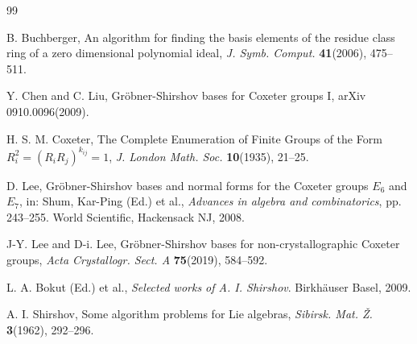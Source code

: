 \documentclass[UTF8]{amsart}
\theoremstyle{definition}
\theoremstyle{remark}
\numberwithin{equation}{section}
\begin{document}
\begin{thebibliography}{99}

B. Buchberger, An algorithm for finding the basis elements of the residue
class ring of a zero dimensional polynomial ideal, {\it J. Symb. Comput.} {\bf 41}(2006), 475--511.

Y. Chen and C. Liu, Gr\"{o}bner-Shirshov bases for {C}oxeter groups {I}, ar{X}iv 0910.0096(2009).

H. S. M. Coxeter, The Complete Enumeration of Finite Groups of the Form $R_i^2=(R_iR_j)^{k_{ij}}=1$, {\it J. London Math. Soc.} {\bf 10}(1935), 21--25.

D. Lee, Gr\"{o}bner-{S}hirshov bases and normal forms for the {C}oxeter groups $E_6$ and $E_7$, in: Shum, Kar-Ping (Ed.) et al., \emph{Advances in algebra and combinatorics}, pp. 243--255. World Scientific, Hackensack NJ, 2008.

J-Y. Lee and D-i. Lee, Gr\"{o}bner-{S}hirshov bases for non-crystallographic {C}oxeter groups, {\it Acta Crystallogr. Sect. A} {\bf 75}(2019), 584--592.

L. A. Bokut (Ed.) et al., \emph{Selected works of {A}. {I}. {S}hirshov}. Birkhäuser Basel, 2009.

A. I. Shirshov, Some algorithm problems for {L}ie algebras, {\it Sibirsk. Mat. \v{Z}.} {\bf 3}(1962), 292--296.
\end{thebibliography}

%
%
\end{document}
